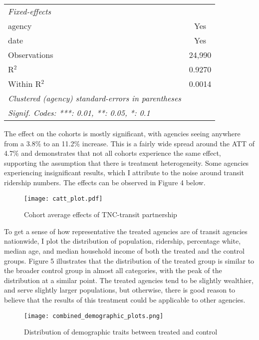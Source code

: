 \documentclass [12pt]{report}
\begin{document}
\begin{table}[H]
\begin{tabular}{lc}
   \midrule
   \multicolumn{1}{l}{\emph{Fixed-effects}} & \\
   agency & Yes \\  
   date & Yes \\   
   \midrule
   Observations              & 24,990\\  
   R$^2$                     & 0.9270\\  
   Within R$^2$              & 0.0014\\  
   \midrule \midrule
   \multicolumn{1}{l}{\emph{Clustered (agency) standard-errors in parentheses}}\\
   \multicolumn{1}{l}{\emph{Signif. Codes: ***: 0.01, **: 0.05, *: 0.1}}\\
\end{tabular}
\end{table}
\indent The effect on the cohorts is mostly significant, with agencies seeing anywhere from a 3.8\% to an 11.2\% increase. This is a fairly wide spread around the ATT of 4.7\% and demonstrates that not all cohorts experience the same effect, supporting the assumption that there is treatment heterogeneity. Some agencies experiencing insignificant results, which I attribute to the noise around transit ridership numbers. The effects can be observed in Figure 4 below.
\begin{figure}[H]
    \centering
    \texttt{[image: catt\_plot.pdf]} %
    \caption{Cohort average effects of TNC-transit partnership}
\end{figure}


\indent To get a sense of how representative the treated agencies are of transit agencies nationwide, I plot the distribution of population, ridership, percentage white, median age, and median household income of both the treated and the control groups. Figure 5 illustrates that the distribution of the treated group is similar to the broader control group in almost all categories, with the peak of the distribution at a similar point. The treated agencies tend to be slightly wealthier, and serve slightly larger populations, but otherwise, there is good reason to believe that the results of this treatment could be applicable to other agencies.
\begin{figure}[H]
    \centering
    \texttt{[image: combined\_demographic\_plots.png]} %
    \caption{Distribution of demographic traits between treated and control}
\end{figure}
\end{document}

